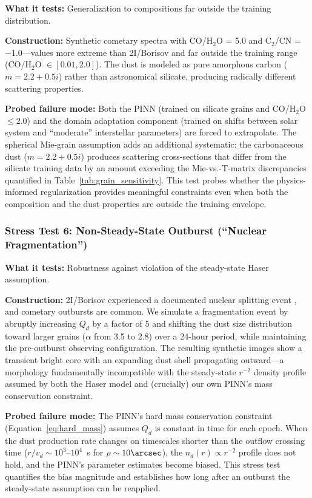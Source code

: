 \documentclass[preprint2]{aastex631}
\begin{document}
\textbf{What it tests:} Generalization to compositions far outside the training distribution.

\textbf{Construction:} Synthetic cometary spectra with CO/H$_2$O = 5.0 and C$_2$/CN = $-1.0$---values more extreme than 2I/Borisov and far outside the training range (CO/H$_2$O $\in [0.01, 2.0]$). The dust is modeled as pure amorphous carbon ($m = 2.2 + 0.5i$) rather than astronomical silicate, producing radically different scattering properties.

\textbf{Probed failure mode:} Both the PINN (trained on silicate grains and CO/H$_2$O $\leq 2.0$) and the domain adaptation component (trained on shifts between solar system and ``moderate'' interstellar parameters) are forced to extrapolate. The spherical Mie-grain assumption adds an additional systematic: the carbonaceous dust ($m = 2.2 + 0.5i$) produces scattering cross-sections that differ from the silicate training data by an amount exceeding the Mie-vs.-T-matrix discrepancies quantified in Table~\ref{tab:grain_sensitivity}. This test probes whether the physics-informed regularization provides meaningful constraints even when both the composition and the dust properties are outside the training envelope.

\subsubsection{Stress Test 6: Non-Steady-State Outburst (``Nuclear Fragmentation'')}

\textbf{What it tests:} Robustness against violation of the steady-state Haser assumption.

\textbf{Construction:} 2I/Borisov experienced a documented nuclear splitting event \citep{jewitt20}, and cometary outbursts are common. We simulate a fragmentation event by abruptly increasing $Q_d$ by a factor of 5 and shifting the dust size distribution toward larger grains ($\alpha$ from 3.5 to 2.8) over a 24-hour period, while maintaining the pre-outburst observing configuration. The resulting synthetic images show a transient bright core with an expanding dust shell propagating outward---a morphology fundamentally incompatible with the steady-state $r^{-2}$ density profile assumed by both the Haser model and (crucially) our own PINN's mass conservation constraint.

\textbf{Probed failure mode:} The PINN's hard mass conservation constraint (Equation~\ref{eq:hard_mass}) assumes $Q_d$ is constant in time for each epoch. When the dust production rate changes on timescales shorter than the outflow crossing time ($r/v_d \sim 10^3$--$10^4$~s for $\rho \sim 10\arcsec$), the $n_d(r) \propto r^{-2}$ profile does not hold, and the PINN's parameter estimates become biased. This stress test quantifies the bias magnitude and establishes how long after an outburst the steady-state assumption can be reapplied.
\end{document}
